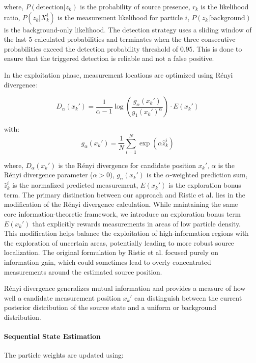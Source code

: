 \documentclass[../report.tex]{subfiles}
\begin{document}
    where, $P(\text{detection}|z_k)$ is the probability of source presence, $r_k$ is the likelihood ratio, $P(z_k|X_k^i)$ is the measurement likelihood for particle $i$, $P(z_k|\text{background})$ 
    is the background-only likelihood. The detection strategy uses a sliding window of the last 5 calculated probabilities and terminates when the three consecutive probabilities exceed the detection
    probability threshold of 0.95. This is done to ensure that the triggered detection is reliable and not a false positive.

    In the exploitation phase, measurement locations are optimized using Rényi divergence:

    \begin{equation}
    D_\alpha(x_k') = \frac{1}{\alpha-1} \log\left(\frac{g_\alpha(x_k')}{g_1(x_k')^\alpha}\right) \cdot E(x_k')
    \end{equation}

    with:
    \begin{equation}
    g_\alpha(x_k') = \frac{1}{N}\sum_{i=1}^N \exp(\alpha \hat{z}_k^i)
    \end{equation}

    where, $D_\alpha(x_k')$ is the Rényi divergence for candidate position $x_k'$, $\alpha$ is the Rényi divergence parameter ($\alpha > 0$), $g_\alpha(x_k')$ is the $\alpha$-weighted prediction 
    sum, $\hat{z}_k^i$ is the normalized predicted measurement, $E(x_k')$ is the exploration bonus term. The primary distinction between our approach and Ristic et al. \cite{ristic2010information}
    lies in the modification of the Rényi divergence calculation. While maintaining the same core information-theoretic framework, we introduce an exploration bonus term $E(x_k')$ that explicitly 
    rewards measurements in areas of low particle density. This modification helps balance the exploitation of high-information regions with the exploration of uncertain areas, potentially leading 
    to more robust source localization. The original formulation by Ristic et al. focused purely on information gain, which could sometimes lead to overly concentrated measurements around the 
    estimated source position.

    Rényi divergence generalizes mutual information and provides a measure of how well a candidate measurement position $x_k'$ can distinguish between the current posterior distribution of the source state and a uniform or background distribution.

    \paragraph{Sequential State Estimation}
    The particle weights are updated using:
\end{document}
